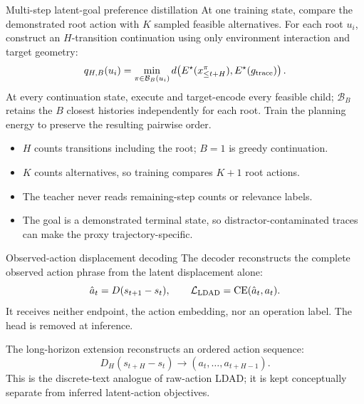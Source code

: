\documentclass[aspectratio=169,10pt]{beamer}
\begin{document}
\begin{frame}{Multi-step latent-goal preference distillation}
\small
At one training state, compare the demonstrated root action with $K$ sampled
feasible alternatives. For each root $u_i$, construct an $H$-transition
continuation using only environment interaction and target geometry:
\[
q_{H,B}(u_i)=\min_{\pi\in\mathcal B_B(u_i)}
d\!\left(E^\star(x_{\leq t+H}^{\pi}),E^\star(g_{\rm trace})\right).
\]
At every continuation state, execute and target-encode every feasible child;
$\mathcal B_B$ retains the $B$ closest histories independently for each root.
Train the planning energy to preserve the resulting pairwise order.

\medskip
\begin{itemize}
\item $H$ counts transitions including the root; $B=1$ is greedy continuation.
\item $K$ counts alternatives, so training compares $K+1$ root actions.
\item The teacher never reads remaining-step counts or relevance labels.
\item The goal is a demonstrated terminal state, so distractor-contaminated
traces can make the proxy trajectory-specific.
\end{itemize}
\end{frame}

\begin{frame}{Observed-action displacement decoding}
\small
The decoder reconstructs the complete observed action phrase from the latent
displacement alone:
\[
\hat a_t=D(s_{t+1}-s_t),\qquad
\mathcal L_{\rm LDAD}=\operatorname{CE}(\hat a_t,a_t).
\]
It receives neither endpoint, the action embedding, nor an operation label.
The head is removed at inference.

\medskip
The long-horizon extension reconstructs an ordered action sequence:
\[
D_H(s_{t+H}-s_t)\rightarrow(a_t,\ldots,a_{t+H-1}).
\]
This is the discrete-text analogue of raw-action LDAD; it is kept conceptually
separate from inferred latent-action objectives.
\end{frame}
\end{document}
